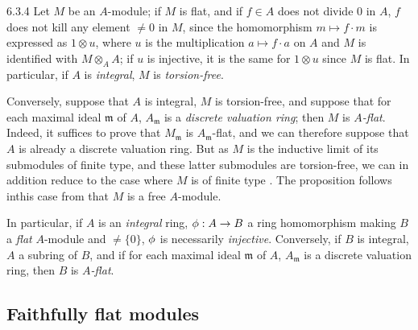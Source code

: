 \begin{env}{6.3.4}
\label{env-0.6.3.4}
Let $M$ be an $A$-module; if $M$ is flat, and if $f\in A$ does not divide $0$ in $A$, $f$
does not kill any element $\neq 0$ in $M$, since the homomorphism $m\mapsto f\cdot m$ is
expressed as $1\otimes u$, where $u$ is the multiplication $a\mapsto f\cdot a$ on $A$ and
$M$ is identified with $M\otimes_A A$; if $u$ is injective, it is the same for $1\otimes u$
since $M$ is flat. In particular, if $A$ is \emph{integral}, $M$ is \emph{torsion-free}.

Conversely, suppose that $A$ is integral, $M$ is torsion-free, and suppose that for each
maximal ideal $\mathfrak{m}$ of $A$, $A_\mathfrak{m}$ is a \emph{discrete valuation ring};
then $M$ is \emph{$A$-flat}. Indeed, it suffices  to prove that
$M_\mathfrak{m}$ is $A_\mathfrak{m}$-flat, and we can therefore suppose that $A$ is already
a discrete valuation ring. But as $M$ is the inductive limit of its submodules of finite
type, and these latter submodules are torsion-free, we can in addition reduce to the case
where $M$ is of finite type . The proposition follows inthis case from
that $M$ is a free $A$-module.

In particular, if $A$ is an \emph{integral} ring, $\phi:A\to B$ a ring homomorphism making
$B$ a \emph{flat} $A$-module and $\neq\{0\}$, $\phi$ is necessarily \emph{injective}.
Conversely, if $B$ is integral, $A$ a subring of $B$, and if for each maximal ideal
$\mathfrak{m}$ of $A$, $A_\mathfrak{m}$ is a discrete valuation ring, then $B$ is
\emph{$A$-flat}.
\end{env}

\subsection{Faithfully flat modules}
\label{0-prelim-6.4}

